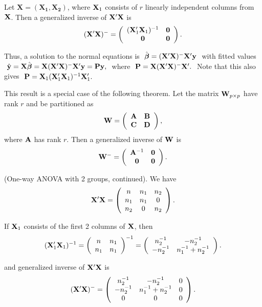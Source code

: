 Let $\mathbf{X=(X_1, X_2)}$, where $\mathbf{X}_1$ consists of $r$ linearly
independent columns from $\mathbf{X}$.  Then a generalized inverse of
$\mathbf{X}'\mathbf{X}$ is
$$
(\mathbf{X}'\mathbf{X})^-=
\left(\begin{array}{cc}
	(\mathbf{X}'_1\mathbf{X}_1)^{-1}&\mathbf{0}\\
	\mathbf{0}&\mathbf{0}
\end{array}\right).
$$

Thus, a solution to the normal equations is $\ \hat{\mbox{\boldmath $\beta$}}=(\mathbf{X}'\mathbf{X})^-
\mathbf{X}'\mathbf{y}\ $ with fitted values $\ \hat{\bfy}=\bfX\hat{\bfbet}=\bfX(\bfX'\bfX)^-
\bfX'\bfy=\bfP\bfy,\ $ where $\ \bfP=\bfX(\bfX'\bfX)^-\bfX'.\ $ Note
that this also gives $\ \bfP=\bfX_1(\bfX'_1\bfX_1)^{-1}\bfX'_1.\ $

This result is a special case of the following theorem.
\btheo
Let the matrix $\mathbf{W}_{p\times p}$ have rank $r$ and be partitioned as
$$
\mathbf{W}=\left(\begin{array}{cc} \mathbf{A}&\mathbf{B}\\ \mathbf{C}&\mathbf{D} \end{array}\right),
$$
where $\mathbf{A}$ has rank $r$.  Then a generalized inverse of $\mathbf{W}$ is
$$
\mathbf{W}^-=\left(\begin{array}{cc} \mathbf{A}^{-1}&\mathbf{0}\\ 
\mathbf{0}&\mathbf{0} \end{array}\right).
$$
\etheo

\bexa 
(One-way ANOVA with 2 groups, continued). We have
$$
\mathbf{X}'\mathbf{X}=
\left(\begin{array}{ccc}
	n & n_1 & n_2 \\
	n_1 & n_1 & 0 \\
	n_2 & 0 & n_2 
\end{array}\right).
$$

If $\mathbf{X}_1$ consists of the first 2 columns of $\mathbf{X}$, then
$$
(\mathbf{X}'_1\mathbf{X}_1)^{-1}=
\left(\begin{array}{cc}n&n_1\\n_1&n_1\end{array}\right)^{-1}
=\left(\begin{array}{cc} n_2^{-1}&-n_2^{-1}\\-n_2^{-1}&n_1^{-1}+n_2^{-1}
	\end{array}\right).
$$

and generalized inverse of $\mathbf{X}'\mathbf{X}$ is
$$
(\mathbf{X}'\mathbf{X})^-=
\left(\begin{array}{ccc}
	n_2^{-1} & -n_2^{-1} & 0 \\
	-n_2^{-1} & n_1^{-1}+n_2^{-1} & 0 \\
	0 & 0 & 0
\end{array}\right).
$$

